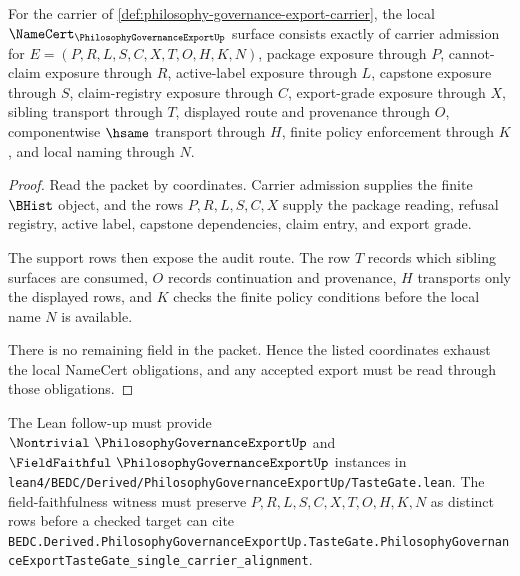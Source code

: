 \begin{theorem}
\label{thm:philosophy-governance-export-namecert-obligations}
For the carrier of \autoref{def:philosophy-governance-export-carrier}, the local $\NameCert_{\PhilosophyGovernanceExportUp}$ surface consists exactly of carrier admission for $E=(P,R,L,S,C,X,T,O,H,K,N)$, package exposure through $P$, cannot-claim exposure through $R$, active-label exposure through $L$, capstone exposure through $S$, claim-registry exposure through $C$, export-grade exposure through $X$, sibling transport through $T$, displayed route and provenance through $O$, componentwise $\hsame$ transport through $H$, finite policy enforcement through $K$, and local naming through $N$.
\end{theorem}
\begin{proof}
Read the packet by coordinates. Carrier admission supplies the finite $\BHist$ object, and the rows $P,R,L,S,C,X$ supply the package reading, refusal registry, active label, capstone dependencies, claim entry, and export grade.

The support rows then expose the audit route. The row $T$ records which sibling surfaces are consumed, $O$ records continuation and provenance, $H$ transports only the displayed rows, and $K$ checks the finite policy conditions before the local name $N$ is available.

There is no remaining field in the packet. Hence the listed coordinates exhaust the local NameCert obligations, and any accepted export must be read through those obligations.
\end{proof}



The Lean follow-up must provide $\Nontrivial\ \PhilosophyGovernanceExportUp$ and $\FieldFaithful\ \PhilosophyGovernanceExportUp$ instances in \texttt{lean4/BEDC/Derived/PhilosophyGovernanceExportUp/TasteGate.lean}. The field-faithfulness witness must preserve $P,R,L,S,C,X,T,O,H,K,N$ as distinct rows before a checked target can cite \texttt{BEDC.Derived.PhilosophyGovernanceExportUp.TasteGate.PhilosophyGovernanceExportTasteGate\_single\_carrier\_alignment}.

